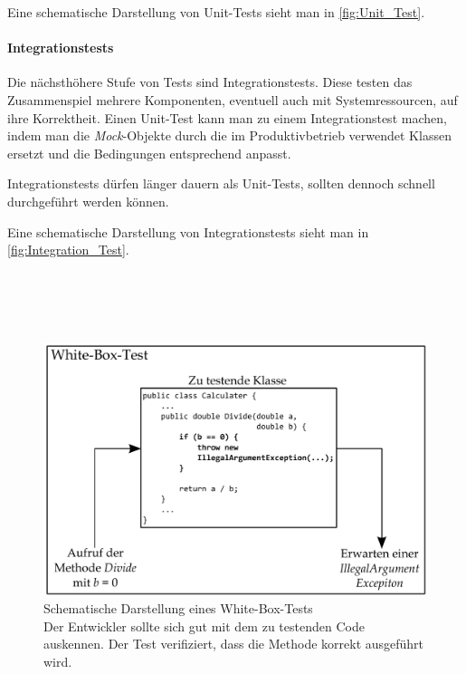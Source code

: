 Eine schematische Darstellung von Unit-Tests sieht man in \autoref{fig:Unit_Test}.

\paragraph{Integrationstests} Die nächsthöhere Stufe von Tests sind Integrationstests. Diese testen das Zusammenspiel mehrere Komponenten, eventuell auch mit Systemressourcen, auf ihre Korrektheit. Einen Unit-Test kann man zu einem Integrationstest machen, indem man die \textit{Mock}-Objekte durch die im Produktivbetrieb verwendet Klassen ersetzt und die Bedingungen entsprechend anpasst.

Integrationstests dürfen länger dauern als Unit-Tests, sollten dennoch schnell durchgeführt werden können.

Eine schematische Darstellung von Integrationstests sieht man in \autoref{fig:Integration_Test}.\\\\\\\\\\

\begin{figure}[h]
\centering
\includegraphics[width=0.8\linewidth]{./images/Kapitel_Einleitung/White_Box_Test.pdf}
\caption[Schematische Darstellung eines White-Box-Tests]{Schematische Darstellung eines White-Box-Tests\\Der Entwickler sollte sich gut mit dem zu testenden Code auskennen. Der Test verifiziert, dass die Methode korrekt ausgeführt wird.}
\label{fig:White_Box_Test}
\end{figure}

